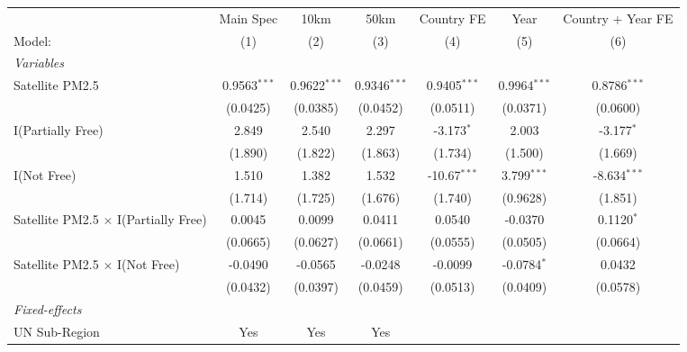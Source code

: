 
\begingroup
\centering
\begin{tabular}{lcccccc}
   \tabularnewline \midrule \midrule
                                               & Main Spec      & 10km           & 50km           & Country FE     & Year           & Country + Year FE \\   
   Model:                                      & (1)            & (2)            & (3)            & (4)            & (5)            & (6)\\  
   \midrule
   \emph{Variables}\\
   Satellite PM2.5                             & 0.9563$^{***}$ & 0.9622$^{***}$ & 0.9346$^{***}$ & 0.9405$^{***}$ & 0.9964$^{***}$ & 0.8786$^{***}$\\   
                                               & (0.0425)       & (0.0385)       & (0.0452)       & (0.0511)       & (0.0371)       & (0.0600)\\   
   I(Partially Free)                           & 2.849          & 2.540          & 2.297          & -3.173$^{*}$   & 2.003          & -3.177$^{*}$\\   
                                               & (1.890)        & (1.822)        & (1.863)        & (1.734)        & (1.500)        & (1.669)\\   
   I(Not Free)                                 & 1.510          & 1.382          & 1.532          & -10.67$^{***}$ & 3.799$^{***}$  & -8.634$^{***}$\\   
                                               & (1.714)        & (1.725)        & (1.676)        & (1.740)        & (0.9628)       & (1.851)\\   
   Satellite PM2.5 $\times$ I(Partially Free)  & 0.0045         & 0.0099         & 0.0411         & 0.0540         & -0.0370        & 0.1120$^{*}$\\   
                                               & (0.0665)       & (0.0627)       & (0.0661)       & (0.0555)       & (0.0505)       & (0.0664)\\   
   Satellite PM2.5 $\times$ I(Not Free)        & -0.0490        & -0.0565        & -0.0248        & -0.0099        & -0.0784$^{*}$  & 0.0432\\   
                                               & (0.0432)       & (0.0397)       & (0.0459)       & (0.0513)       & (0.0409)       & (0.0578)\\   
   \midrule
   \emph{Fixed-effects}\\
   UN Sub-Region                               & Yes            & Yes            & Yes            &                &                & \\  

\end{tabular}
